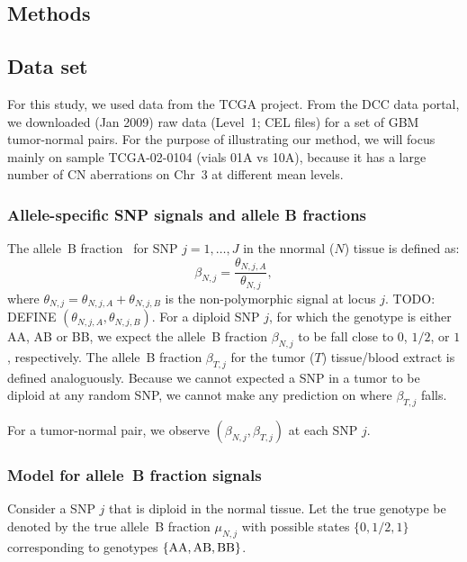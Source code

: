 \documentclass[]{bioinfo}
\newcommand{\gAA}{\textnormal{AA}\xspace}
\newcommand{\gAB}{\textnormal{AB}\xspace}
\newcommand{\gBB}{\textnormal{BB}\xspace}
\begin{document}
\begin{methods}
\section{Methods}



\subsection{Data set}
For this study, we used data from the TCGA project.  From the DCC data portal, we downloaded (Jan 2009) raw data (Level~1; CEL files) for a set of GBM tumor-normal pairs.
For the purpose of illustrating our method, we will focus mainly on sample TCGA-02-0104 (vials 01A vs 10A), because it has a large number of CN aberrations on Chr~3 at different mean levels.


\subsubsection{Allele-specific SNP signals and allele B fractions}
The allele~B fraction~\cite{PeifferD_etal_2006} for SNP $j=1,\ldots,J$ in the nnormal ($N$) tissue is defined as:
\begin{equation}
  \beta_{N,j} = \frac{\theta_{N,j,A}}{\theta_{N,j}},
  \label{eqnCnLogRatio}
\end{equation}
where $\theta_{N,j} = \theta_{N,j,A} + \theta_{N,j,B}$ is the non-polymorphic signal at locus $j$.
TODO: DEFINE $(\theta_{N,j,A}, \theta_{N,j,B})$.
For a diploid SNP $j$, for which the genotype is either AA, AB or BB, we expect the allele~B fraction $\beta_{N,j}$ to be fall close to $0$, $1/2$, or $1$, respectively.
The allele~B fraction $\beta_{T,j}$ for the tumor ($T$) tissue/blood extract is defined analoguously. Because we cannot expected a SNP in a tumor to be diploid at any random SNP, we cannot make any prediction on where $\beta_{T,j}$ falls.

For a tumor-normal pair, we observe $(\beta_{N,j}, \beta_{T,j})$ at each SNP $j$.

\subsubsection{Model for allele~B fraction signals}
Consider a SNP $j$ that is diploid in the normal tissue.  
Let the true genotype be denoted by the true allele~B fraction $\mu_{N,j}$ with possible states $\{0,1/2,1\}$ corresponding to genotypes $\{\gAA,\gAB,\gBB\}$.


\end{methods}
\end{document}
